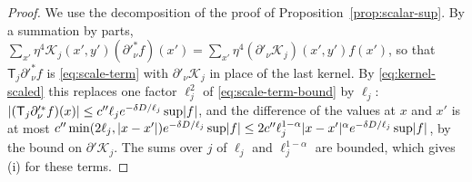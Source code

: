 \documentclass[11pt]{preprint}
\DeclarePairedDelimiter{\abs}{\lvert}{\rvert}
\numberwithin{equation}{section}
\theoremstyle{definition}
\theoremstyle{remark}
\theoremstyle{plain}
\begin{document}
\begin{proof}
We use the decomposition of the proof of Proposition~\ref{prop:scalar-sup}. By a summation by parts, $\sum_{x'}\eta^4\mathcal K_j(x', y')(\partial'^*_\nu f)(x') = \sum_{x'}\eta^4(\partial'_\nu\mathcal K_j)(x', y')f(x')$, so that $\mathsf T_j\partial'^*_\nu f$ is \eqref{eq:scale-term} with $\partial'_\nu\mathcal K_j$ in place of the last kernel. By \eqref{eq:kernel-scaled} this replaces one factor $\ell_j^2$ of \eqref{eq:scale-term-bound} by $\ell_j$: $\abs{(\mathsf T_j\partial'^*_\nu f)(x)} \leq c''\ell_je^{-\delta D/\ell_j}\sup\abs f$, and the difference of the values at $x$ and $x'$ is at most $c''\min(2\ell_j, \abs{x - x'})e^{-\delta D/\ell_j}\sup\abs f \leq 2c''\ell_j^{1-\alpha}\abs{x - x'}^\alpha e^{-\delta D/\ell_j}\sup\abs f$, by the bound on $\partial'\mathcal K_j$. The sums over $j$ of $\ell_j$ and $\ell_j^{1-\alpha}$ are bounded, which gives (i) for these terms.


\end{proof}
\end{document}
